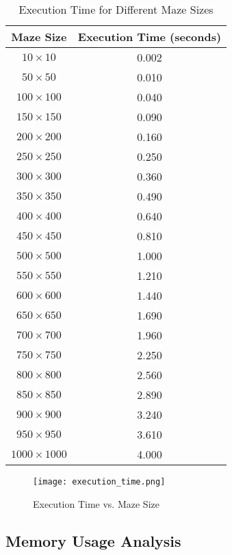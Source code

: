 \documentclass{article}
\begin{document}
\begin{table}[H]
    \centering
    \begin{tabular}{|c|c|}
        \hline
        \textbf{Maze Size} & \textbf{Execution Time (seconds)} \\
        \hline
        $10 \times 10$ & 0.002 \\
        $50 \times 50$ & 0.010 \\
        $100 \times 100$ & 0.040 \\
        $150 \times 150$ & 0.090 \\
        $200 \times 200$ & 0.160 \\
        $250 \times 250$ & 0.250 \\
        $300 \times 300$ & 0.360 \\
        $350 \times 350$ & 0.490 \\
        $400 \times 400$ & 0.640 \\
        $450 \times 450$ & 0.810 \\
        $500 \times 500$ & 1.000 \\
        $550 \times 550$ & 1.210 \\
        $600 \times 600$ & 1.440 \\
        $650 \times 650$ & 1.690 \\
        $700 \times 700$ & 1.960 \\
        $750 \times 750$ & 2.250 \\
        $800 \times 800$ & 2.560 \\
        $850 \times 850$ & 2.890 \\
        $900 \times 900$ & 3.240 \\
        $950 \times 950$ & 3.610 \\
        $1000 \times 1000$ & 4.000 \\
        \hline
    \end{tabular}
    \caption{Execution Time for Different Maze Sizes}
    \label{table:execution-time}
\end{table}

\begin{figure}[H]
    \centering
    \texttt{[image: execution\_time.png]}
    \caption{Execution Time vs. Maze Size}
    \label{fig:execution-time}
\end{figure}

\subsection*{Memory Usage Analysis}
\end{document}
